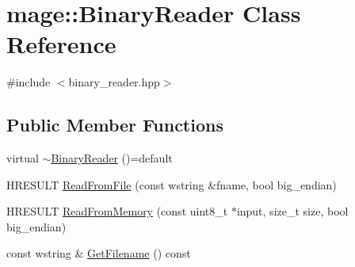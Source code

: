 \hypertarget{classmage_1_1_binary_reader}{}\section{mage\+:\+:Binary\+Reader Class Reference}
\label{classmage_1_1_binary_reader}


{\ttfamily \#include $<$binary\+\_\+reader.\+hpp$>$}

\subsection*{Public Member Functions}
\begin{DoxyCompactItemize}
\item 
virtual \hyperlink{classmage_1_1_binary_reader_aa300382cfa1585bb2f76c4e764bb5617}{$\sim$\+Binary\+Reader} ()=default
\item 
H\+R\+E\+S\+U\+LT \hyperlink{classmage_1_1_binary_reader_ad1d395eabc03da0a52fc0df59623e0a4}{Read\+From\+File} (const wstring \&fname, bool big\+\_\+endian)
\item 
H\+R\+E\+S\+U\+LT \hyperlink{classmage_1_1_binary_reader_ac0bf066e76b7ac0f5308109ae431007d}{Read\+From\+Memory} (const uint8\+\_\+t $\ast$input, size\+\_\+t size, bool big\+\_\+endian)
\item 
const wstring \& \hyperlink{classmage_1_1_binary_reader_a10a0ec56fe7f8e63964ffca2afe019a3}{Get\+Filename} () const
\end{DoxyCompactItemize}
